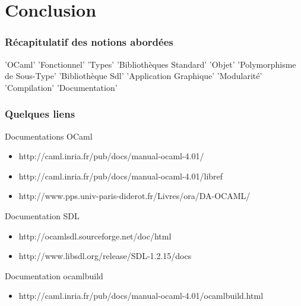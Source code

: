 \section*{Conclusion}

\begin{frame}
	\frametitle{Récapitulatif des notions abordées}
	\large
	\begin{center}
	'OCaml' 'Fonctionnel'
	'Types' 'Bibliothèques Standard' 'Objet' 'Polymorphisme de Sous-Type' 'Bibliothèque Sdl' 'Application Graphique' 'Modularité' 'Compilation'
	'Documentation'
	\end{center}
\end{frame}

\begin{frame}
	\frametitle{Quelques liens}
	\begin{block}{Documentations OCaml}
		\begin{itemize}
			\item http://caml.inria.fr/pub/docs/manual-ocaml-4.01/
			\item http://caml.inria.fr/pub/docs/manual-ocaml-4.01/libref

			\item http://www.pps.univ-paris-diderot.fr/Livres/ora/DA-OCAML/
		\end{itemize}
	\end{block}
	\begin{block}{Documentation SDL}
		\begin{itemize}
			\item http://ocamlsdl.sourceforge.net/doc/html
			\item http://www.libsdl.org/release/SDL-1.2.15/docs
		\end{itemize}
	\end{block}
	\begin{block}{Documentation ocamlbuild}
		\begin{itemize}
			\item http://caml.inria.fr/pub/docs/manual-ocaml-4.01/ocamlbuild.html
		\end{itemize}
	\end{block}
\end{frame}
